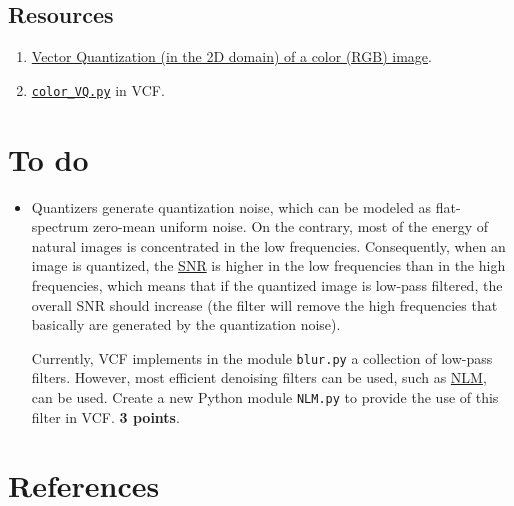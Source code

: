 \subsection*{Resources}

\begin{enumerate}
\item
  \href{https://github.com/vicente-gonzalez-ruiz/vector_quantization/blob/main/docs/spatial_color_VQ.ipynb}{Vector
    Quantization (in the 2D domain) of a color (RGB) image}.
\item
  \href{https://github.com/Sistemas-Multimedia/VCF/blob/main/src/color-VQ.py}{\texttt{color\_VQ.py}}
  in VCF.
\end{enumerate}


\section*{To do}
\begin{itemize}
\item Quantizers generate quantization noise, which can be modeled as
  flat-spectrum zero-mean uniform noise. On the contrary, most of the
  energy of natural images is concentrated in the low
  frequencies. Consequently, when an image is quantized, the
  \href{https://en.wikipedia.org/wiki/Signal-to-noise_ratio}{SNR} is
  higher in the low frequencies than in the high frequencies, which
  means that if the quantized image is low-pass filtered, the overall
  SNR should increase (the filter will remove the high frequencies
  that basically are generated by the quantization noise).

  Currently, VCF implements in the module \texttt{blur.py} a
  collection of low-pass filters. However, most efficient denoising
  filters can be used, such as
  \href{https://docs.opencv.org/3.4/d5/d69/tutorial_py_non_local_means.html}{NLM},
  can be used. Create a new Python module \texttt{NLM.py} to provide
  the use of this filter in VCF. \textbf{3 points}.
\end{itemize}

\section{References}

\renewcommand{\addcontentsline}[3]{}%

